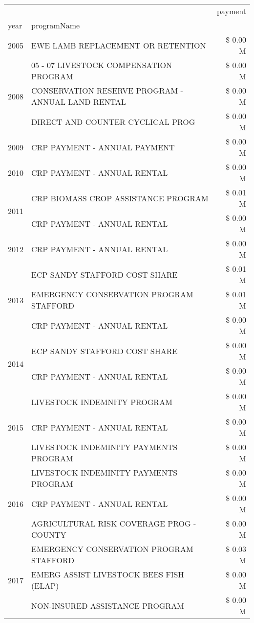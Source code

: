 \begin{tabular}{llr}
\toprule
 &  & payment \\
year & programName &  \\
\midrule
2005 & EWE LAMB REPLACEMENT OR RETENTION & \$ 0.00 M \\
\cline{1-3}
\multirow[t]{3}{*}{2008} & 05 - 07 LIVESTOCK COMPENSATION PROGRAM & \$ 0.00 M \\
 & CONSERVATION RESERVE PROGRAM - ANNUAL LAND RENTAL & \$ 0.00 M \\
 & DIRECT AND COUNTER CYCLICAL PROG & \$ 0.00 M \\
\cline{1-3}
2009 & CRP PAYMENT - ANNUAL PAYMENT & \$ 0.00 M \\
\cline{1-3}
2010 & CRP PAYMENT - ANNUAL RENTAL & \$ 0.00 M \\
\cline{1-3}
\multirow[t]{2}{*}{2011} & CRP BIOMASS CROP ASSISTANCE PROGRAM & \$ 0.01 M \\
 & CRP PAYMENT - ANNUAL RENTAL & \$ 0.00 M \\
\cline{1-3}
2012 & CRP PAYMENT - ANNUAL RENTAL & \$ 0.00 M \\
\cline{1-3}
\multirow[t]{3}{*}{2013} & ECP SANDY STAFFORD COST SHARE & \$ 0.01 M \\
 & EMERGENCY CONSERVATION PROGRAM STAFFORD & \$ 0.01 M \\
 & CRP PAYMENT - ANNUAL RENTAL & \$ 0.00 M \\
\cline{1-3}
\multirow[t]{2}{*}{2014} & ECP SANDY STAFFORD COST SHARE & \$ 0.00 M \\
 & CRP PAYMENT - ANNUAL RENTAL & \$ 0.00 M \\
\cline{1-3}
\multirow[t]{3}{*}{2015} & LIVESTOCK INDEMNITY PROGRAM & \$ 0.00 M \\
 & CRP PAYMENT - ANNUAL RENTAL & \$ 0.00 M \\
 & LIVESTOCK INDEMINITY PAYMENTS PROGRAM & \$ 0.00 M \\
\cline{1-3}
\multirow[t]{3}{*}{2016} & LIVESTOCK INDEMINITY PAYMENTS PROGRAM & \$ 0.00 M \\
 & CRP PAYMENT - ANNUAL RENTAL & \$ 0.00 M \\
 & AGRICULTURAL RISK COVERAGE PROG - COUNTY & \$ 0.00 M \\
\cline{1-3}
\multirow[t]{3}{*}{2017} & EMERGENCY CONSERVATION PROGRAM STAFFORD & \$ 0.03 M \\
 & EMERG ASSIST LIVESTOCK BEES FISH (ELAP) & \$ 0.00 M \\
 & NON-INSURED ASSISTANCE PROGRAM & \$ 0.00 M \\

\end{tabular}
